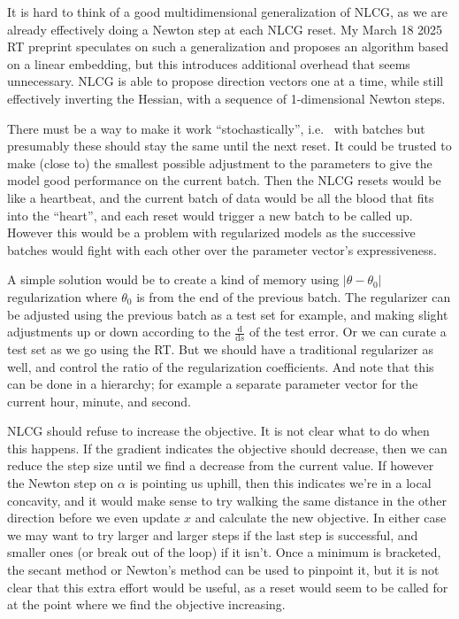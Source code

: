 \documentclass[11pt]{article}
\newcommand{\abs}[1]{\left| #1 \right|}
\renewcommand{\(}{\left(}
\renewcommand{\)}{\right)}
\newcommand{\ud}{\mathrm{d}}
\newcommand{\dby}[2]{\frac{\ud #1}{\ud #2}}
\begin{document}
It is hard to think of a good multidimensional generalization of NLCG,
as we are already effectively doing a Newton step at each NLCG reset.
My March 18 2025 RT preprint speculates on such a generalization and
proposes an algorithm based on a linear embedding, but this introduces
additional overhead that seems unnecessary. NLCG is able to propose
direction vectors one at a time, while still effectively inverting the
Hessian, with a sequence of 1-dimensional Newton steps.

There must be a way to make it work ``stochastically'', i.e.~ with
batches but presumably these should stay the same until the next
reset. It could be trusted to make (close to) the smallest possible
adjustment to the parameters to give the model good performance on the
current batch. Then the NLCG resets would be like a heartbeat, and the
current batch of data would be all the blood that fits into the
``heart'', and each reset would trigger a new batch to be called up.
However this would be a problem with regularized models as the
successive batches would fight with each other over the parameter
vector's expressiveness.

A simple solution would be to create a kind of memory using
$\abs{\theta-\theta_0}$ regularization where $\theta_0$ is from the
end of the previous batch. The regularizer can be adjusted using the
previous batch as a test set for example, and making slight
adjustments up or down according to the $\dby{}{s}$ of the test error.
Or we can curate a test set as we go using the RT. But we should have
a traditional regularizer as well, and control the ratio of the
regularization coefficients. And note that this can be done in a
hierarchy; for example a separate parameter vector for the current
hour, minute, and second.

NLCG should refuse to increase the objective. It is not clear what to
do when this happens. If the gradient indicates the objective should
decrease, then we can reduce the step size until we find a decrease
from the current value. If however the Newton step on $\alpha$ is
pointing us uphill, then this indicates we're in a local concavity,
and it would make sense to try walking the same distance in the other
direction before we even update $x$ and calculate the new objective.
In either case we may want to try larger and larger steps if the last
step is successful, and smaller ones (or break out of the loop) if it
isn't. Once a minimum is bracketed, the secant method or Newton's
method can be used to pinpoint it, but it is not clear that this extra
effort would be useful, as a reset would seem to be called for at the
point where we find the objective increasing.
\end{document}
